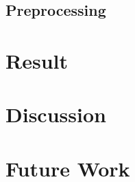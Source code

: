 \documentclass[11pt]{article}
\begin{document}
\subsection{Preprocessing}

\section{Result}\label{sec:result}



\section{Discussion}

\section{Future Work}


\appendix


\end{document}
